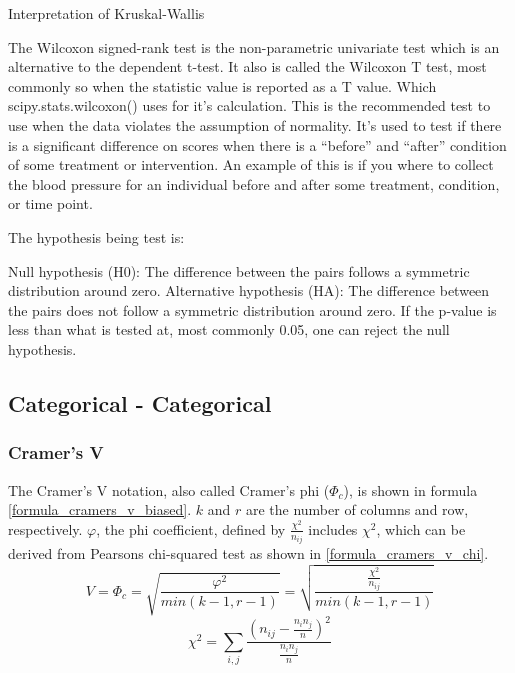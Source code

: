 \documentclass[a4paper,12pt]{report}
\begin{document}
Interpretation of Kruskal-Wallis


The Wilcoxon signed-rank test is the non-parametric univariate test which is an alternative to the dependent t-test. It also is called the Wilcoxon T test, most commonly so when the statistic value is reported as a T value. Which scipy.stats.wilcoxon() uses for it’s calculation. This is the recommended test to use when the data violates the assumption of normality. It’s used to test if there is a significant difference on scores when there is a “before” and “after” condition of some treatment or intervention. An example of this is if you where to collect the blood pressure for an individual before and after some treatment, condition, or time point.

The hypothesis being test is:

Null hypothesis (H0): The difference between the pairs follows a symmetric distribution around zero.
Alternative hypothesis (HA): The difference between the pairs does not follow a symmetric distribution around zero.
If the p-value is less than what is tested at, most commonly 0.05, one can reject the null hypothesis.






\subsection{Categorical - Categorical}

\subsubsection{Cramer’s V}

The Cramer’s V notation, also called Cramer's phi ($\Phi_c$), is shown in formula \ref{formula_cramers_v_biased}. $k$ and $r$ are the number of columns and row, respectively. $\varphi$, the phi coefficient, defined by $\frac{{\chi^2}}{n_{ij}}$ includes $\chi^2$, which can be derived from Pearsons chi-squared test as shown in \ref{formula_cramers_v_chi}. \cite{Sheskin1997,Bergsma2013}
\smallskip
\begin{equation}
\label{formula_cramers_v_biased}
	V = \Phi_c =  \sqrt{\frac{{\varphi^2}}{min(k-1,r-1)}} = \sqrt{\frac{\frac{{\chi^2}}{n_{ij}}}{min(k-1,r-1)}}
\end{equation}
\begin{equation}
\label{formula_cramers_v_chi}
	\chi^2 =  \sum_{i,j}{\frac{(n_{ij}-\frac{n_i n_j}{n})^2}{\frac{n_i n_j}{n}}}
\end{equation}
\end{document}

